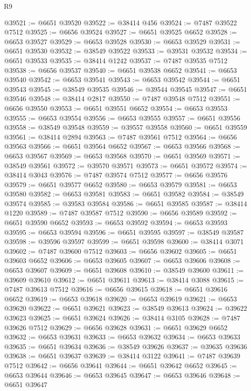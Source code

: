 \begin{lexlean}{R9}
\begin{coremodule}
@39521 := @6651 @39520
@39522 := @38414 @456
@39524 := @7487 @39522 @7512
@39525 := @6656 @39524
@39527 := @6651 @39525 @6652
@39528 := @6653 @39527
@39529 := @6653 @39528
@39530 := @6653 @39529
@39531 := @6651 @39530
@39532 := @38549 @39522
@39533 := @39531 @39532
@39534 := @6651 @39533
@39535 := @38414 @1242
@39537 := @7487 @39535 @7512
@39538 := @6656 @39537
@39540 := @6651 @39538 @6652
@39541 := @6653 @39540
@39542 := @6653 @39541
@39543 := @6653 @39542
@39544 := @6651 @39543
@39545 := @38549 @39535
@39546 := @39544 @39545
@39547 := @6651 @39546
@39548 := @38414 @2817
@39550 := @7487 @39548 @7512
@39551 := @6656 @39550
@39553 := @6651 @39551 @6652
@39554 := @6653 @39553
@39555 := @6653 @39554
@39556 := @6653 @39555
@39557 := @6651 @39556
@39558 := @38549 @39548
@39559 := @39557 @39558
@39560 := @6651 @39559
@39561 := @38414 @2894
@39563 := @7487 @39561 @7512
@39564 := @6656 @39563
@39566 := @6651 @39564 @6652
@39567 := @6653 @39566
@39568 := @6653 @39567
@39569 := @6653 @39568
@39570 := @6651 @39569
@39571 := @38549 @39561
@39572 := @39570 @39571
@39573 := @6651 @39572
@39574 := @38414 @3043
@39576 := @7487 @39574 @7512
@39577 := @6656 @39576
@39579 := @6651 @39577 @6652
@39580 := @6653 @39579
@39581 := @6653 @39580
@39582 := @6653 @39581
@39583 := @6651 @39582
@39584 := @38549 @39574
@39585 := @39583 @39584
@39586 := @6651 @39585
@39587 := @38414 @1220
@39589 := @7487 @39587 @7512
@39590 := @6656 @39589
@39592 := @6651 @39590 @6652
@39593 := @6653 @39592
@39594 := @6653 @39593
@39595 := @6653 @39594
@39596 := @6651 @39595
@39597 := @38549 @39587
@39598 := @39596 @39597
@39599 := @6651 @39598
@39600 := @38414 @3071
@39602 := @7487 @39600 @7512
@39603 := @6656 @39602
@39605 := @6651 @39603 @6652
@39606 := @6653 @39605
@39607 := @6653 @39606
@39608 := @6653 @39607
@39609 := @6651 @39608
@39610 := @38549 @39600
@39611 := @39609 @39610
@39612 := @6651 @39611
@39613 := @38414 @3088
@39615 := @7487 @39613 @7512
@39616 := @6656 @39615
@39618 := @6651 @39616 @6652
@39619 := @6653 @39618
@39620 := @6653 @39619
@39621 := @6653 @39620
@39622 := @6651 @39621
@39623 := @38549 @39613
@39624 := @39622 @39623
@39625 := @6651 @39624
@39626 := @38414 @3105
@39628 := @7487 @39626 @7512
@39629 := @6656 @39628
@39631 := @6651 @39629 @6652
@39632 := @6653 @39631
@39633 := @6653 @39632
@39634 := @6653 @39633
@39635 := @6651 @39634
@39636 := @38549 @39626
@39637 := @39635 @39636
@39638 := @6651 @39637
@39639 := @38414 @3122
@39641 := @7487 @39639 @7512
@39642 := @6656 @39641
@39644 := @6651 @39642 @6652
@39645 := @6653 @39644
@39646 := @6653 @39645
@39647 := @6653 @39646
@39648 := @6651 @39647

\end{coremodule}
\end{lexlean}
